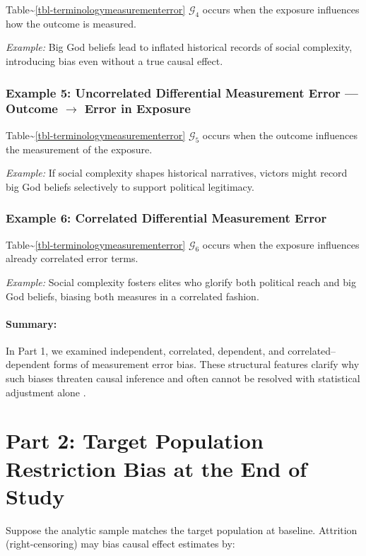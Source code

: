 \documentclass[
  ignorenonframetext,
  aspectratio=169,
]{beamer}
\begin{document}
\begin{frame}
Table\textasciitilde{}\ref{tbl-terminologymeasurementerror}
\(\mathcal{G}_4\) occurs when the exposure influences how the outcome is
measured.

\emph{Example:} Big God beliefs lead to inflated historical records of
social complexity, introducing bias even without a true causal effect.

\subsubsection*{Example 5: Uncorrelated Differential Measurement Error — Outcome $\rightarrow$ Error in Exposure}

Table\textasciitilde{}\ref{tbl-terminologymeasurementerror}
\(\mathcal{G}_5\) occurs when the outcome influences the measurement of
the exposure.

\emph{Example:} If social complexity shapes historical narratives,
victors might record big God beliefs selectively to support political
legitimacy.

\subsubsection*{Example 6: Correlated Differential Measurement Error}

Table\textasciitilde{}\ref{tbl-terminologymeasurementerror}
\(\mathcal{G}_6\) occurs when the exposure influences already correlated
error terms.

\emph{Example:} Social complexity fosters elites who glorify both
political reach and big God beliefs, biasing both measures in a
correlated fashion.

\paragraph{Summary:}

In Part 1, we examined independent, correlated, dependent, and
correlated--dependent forms of measurement error bias. These structural
features clarify why such biases threaten causal inference and often
cannot be resolved with statistical adjustment alone
\citep{vanderweele2012a}.

\section{Part 2: Target Population Restriction Bias at the End of Study}\label{id-sec-2}

Suppose the analytic sample matches the target population at baseline.
Attrition (right-censoring) may bias causal effect estimates by:


\end{frame}
\end{document}
